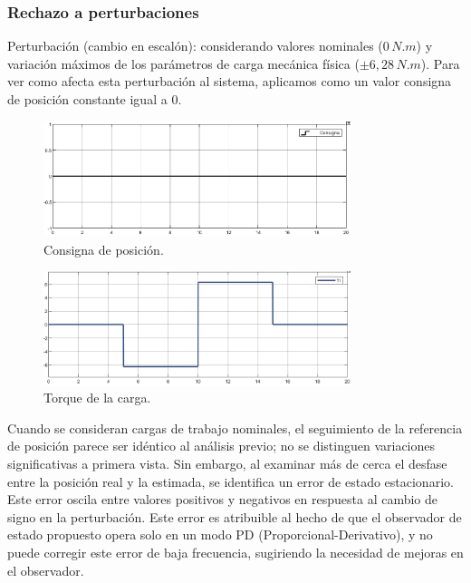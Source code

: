 \documentclass{article}
\begin{document}

\subsubsection{Rechazo a perturbaciones}

Perturbación (cambio en escalón): considerando valores nominales ($0\,N.m$) y variación máximos de 
los parámetros de carga mecánica física  ($\pm 6,28\,N.m$). Para ver como afecta esta perturbación al 
sistema, aplicamos como un valor consigna de posición constante igual a $0$.

\begin{figure}[H]
    \centering
    \includegraphics[width=0.8\textwidth]{5.2.4.b.1.png}
    \caption{Consigna de posición.}
\end{figure}

\begin{figure}[H]
    \centering
    \includegraphics[width=0.8\textwidth]{5.2.4.b.2.png}
    \caption{Torque de la carga.}
\end{figure}

Cuando se consideran cargas de trabajo nominales, el seguimiento de la referencia de posición parece 
ser idéntico al análisis previo; no se distinguen variaciones significativas a primera vista. Sin 
embargo, al examinar más de cerca el desfase entre la posición real y la estimada, se identifica un 
error de estado estacionario. Este error oscila entre valores positivos y negativos en respuesta al 
cambio de signo en la perturbación. Este error es atribuible al hecho de que el observador de estado 
propuesto opera solo en un modo PD (Proporcional-Derivativo), y no puede corregir este error de baja 
frecuencia, sugiriendo la necesidad de mejoras en el observador.
\end{document}

